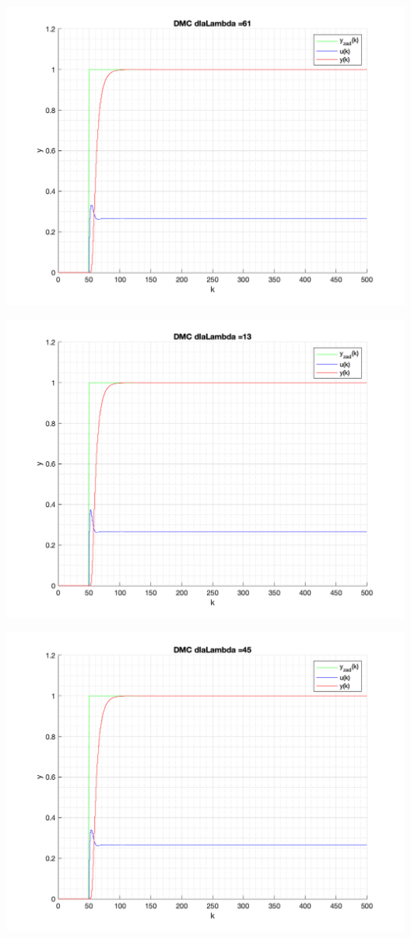 \documentclass[a4paper, 11pt]{article}
\begin{document}
\begin{enumerate}
 \includegraphics[width=\linewidth]{./ModelsP4_Lambda/P4_DMC_Lambda_61_png.png} 
 
 \includegraphics[width=\linewidth]{./ModelsP4_Lambda/P4_DMC_Lambda_13_png.png} 
 
 \includegraphics[width=\linewidth]{./ModelsP4_Lambda/P4_DMC_Lambda_45_png.png} 
 

\end{enumerate}
\end{document}
